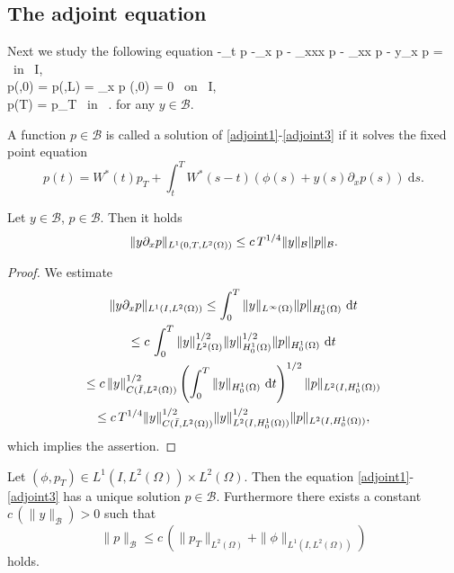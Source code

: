 \subsection{The adjoint equation}
\label{appendixadjoint}
Next we study the following equation
\besn
-\partial_t p -\partial_x p - \partial_{xxx} p - \gamma \partial_{xx} p  - y\partial_x p =  \phi \mbox{ in } I\times\Omega,\label{adjoint1}\\
p(\cdot,0) = p(\cdot,L) = \partial_x p (\cdot,0) = 0 \mbox{ on } I,\label{adjoint2}\\
p(T) = p_{T} \mbox{ in } \Omega.\label{adjoint3}
\eesn
for any $y\in \mathcal B$.
\begin{definition}
A function $p\in \mathcal B$ is called a solution of \eqref{adjoint1}-\eqref{adjoint3} if it solves the fixed point equation
\[
p(t)=W^*(t)p_T+\int_t^TW^*(s-t)(\phi(s)+y(s)\partial_x p(s))~\mathrm ds.
\]
\end{definition}
\begin{lemma}\label{lemadjoint}
  Let $y\in\mathcal B$, $p\in\mathcal B$. Then it holds
\[
\lVert y\partial_x p\rVert_{L^1(0,T,L^2(\Omega))} \leq c\,T^{1/4}\lVert y\rVert_{\mathcal{B}}\lVert p\rVert_{\mathcal{B}}.
\]
\end{lemma}
\begin{proof} 
We estimate
\begin{multline*}
\lVert y\partial_x p\rVert_{L^1(I,L^2(\Omega))}\leq \int_0^T{\lVert y\rVert_{L^{\infty}(\Omega)}\lVert p\rVert_{H^1_0(\Omega)}}~\mathrm dt\\
\leq c\,\int_0^T{\lVert y\rVert_{L^2(\Omega)}^{1/2}\lVert y\rVert_{H^1_0(\Omega)}^{1/2}\lVert p\rVert_{H^1_0(\Omega)}}~\mathrm dt\\
\leq c\,\lVert y\rVert_{C(\bar I,L^2(\Omega))}^{1/2}\left( \int_0^T{\lVert y\rVert_{H^1_0(\Omega)}}~\mathrm dt\right)^{1/2}\lVert p\rVert_{L^2(I,H^1_0(\Omega))}\\
\leq c\, T^{1/4} \lVert y\rVert_{C(\bar I,L^2(\Omega))}^{1/2} \lVert y\rVert_{L^2(I,H^1_0(\Omega))}^{1/2}\lVert p\rVert_{L^2(I,H^1_0(\Omega))},
\end{multline*}
which implies the assertion.
\qquad\end{proof}
\begin{proposition}
Let $(\phi,p_T)\in L^1(I,L^2(\Omega))\times L^2(\Omega)$. Then the equation \eqref{adjoint1}-\eqref{adjoint3} has a unique solution $p\in \mathcal B$. Furthermore there exists a constant $c\,(\|y\|_{\mathcal B})>0$ such that
\begin{equation}\label{apriori_adjoint}
\|p\|_{\mathcal B}\leq c\,(\|p_T\|_{L^2(\Omega)}+\|\phi\|_{L^1(I,L^2(\Omega))})
\end{equation}
holds.
\end{proposition}
